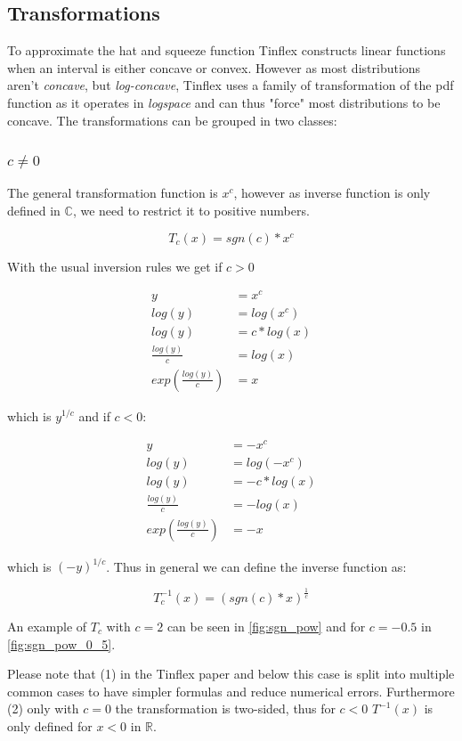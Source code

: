 \documentclass[]{article}
\begin{document}
\subsection{Transformations}

To approximate the hat and squeeze function Tinflex constructs linear functions when an interval is either concave or convex.
However as most distributions aren't \textit{concave}, but \textit{log-concave}, Tinflex uses a family of transformation of the pdf function as it operates in \textit{logspace} and can thus "force" most distributions to be concave. The transformations can be grouped in two classes:

\subsubsection{$c \neq 0$}

The general transformation function is $x^c$, however as inverse function is only defined in $\mathbb{C}$, we need to restrict it to positive numbers.

\[T_c(x) = sgn(c) * x^c\]

With the usual inversion rules we get if $c > 0$

\begin{align*}
y &= x^c \\
log(y) &= log(x^c) \\
log(y) &= c * log(x) \\
\frac{log(y)}{c} &= log(x) \\
exp\left(\frac{log(y)}{c}\right) &= x
\end{align*}

which is $y^{1 / c}$ and if $c < 0$:

\begin{align*}
y &= -x^c \\
log(y) &= log(-x^c) \\
log(y) &= -c * log(x) \\
\frac{log(y)}{c} &= -log(x) \\
exp\left(\frac{log(y)}{c}\right) &= -x
\end{align*}

which is $(-y)^{1 / c}$.
Thus in general we can define the inverse function as:

\[T_c^{-1}(x) = (sgn(c) * x)^{\frac{1}{c}}\]

An example of $T_c$ with $c = 2$ can be seen in \autoref{fig:sgn_pow} and for $c = -0.5$ in \autoref{fig:sgn_pow_0_5}.

Please note that (1) in the Tinflex paper and below this case is split into multiple common cases to have simpler formulas and reduce numerical errors. Furthermore (2) only with $c = 0$ the transformation is two-sided, thus for $c < 0$ $T^{-1}(x)$ is only defined for $x < 0$ in $\mathbb{R}$.
\end{document}
